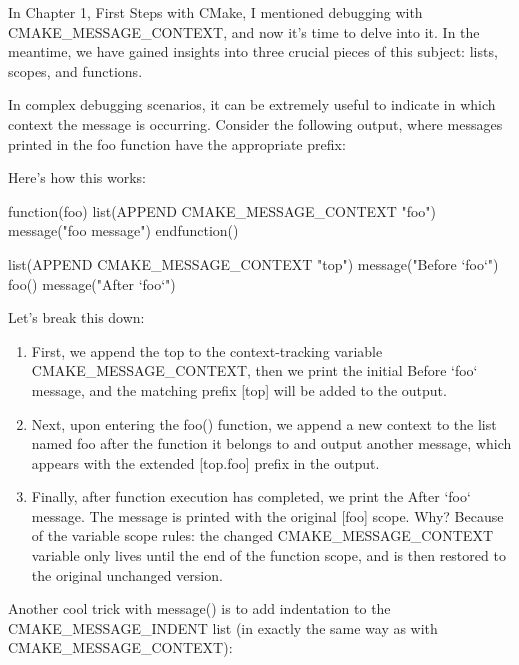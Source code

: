 In Chapter 1, First Steps with CMake, I mentioned debugging with CMAKE\_MESSAGE\_CONTEXT, and now it’s time to delve into it. In the meantime, we have gained insights into three crucial pieces of this subject: lists, scopes, and functions.

In complex debugging scenarios, it can be extremely useful to indicate in which context the message is occurring. Consider the following output, where messages printed in the foo function have the appropriate prefix:


Here’s how this works:


\begin{cmake}
function(foo)
    list(APPEND CMAKE_MESSAGE_CONTEXT "foo")
    message("foo message")
endfunction()

list(APPEND CMAKE_MESSAGE_CONTEXT "top")
message("Before `foo`")
foo()
message("After `foo`")
\end{cmake}

Let’s break this down:

\begin{enumerate}
\item
First, we append the top to the context-tracking variable CMAKE\_MESSAGE\_CONTEXT, then we print the initial Before `foo` message, and the matching prefix [top] will be added to the output.

\item
Next, upon entering the foo() function, we append a new context to the list named foo after the function it belongs to and output another message, which appears with the extended [top.foo] prefix in the output.

\item
Finally, after function execution has completed, we print the After `foo` message. The message is printed with the original [foo] scope. Why? Because of the variable scope rules: the changed CMAKE\_MESSAGE\_CONTEXT variable only lives until the end of the function scope, and is then restored to the original unchanged version.
\end{enumerate}

Another cool trick with message() is to add indentation to the CMAKE\_MESSAGE\_INDENT list (in exactly the same way as with CMAKE\_MESSAGE\_CONTEXT):

